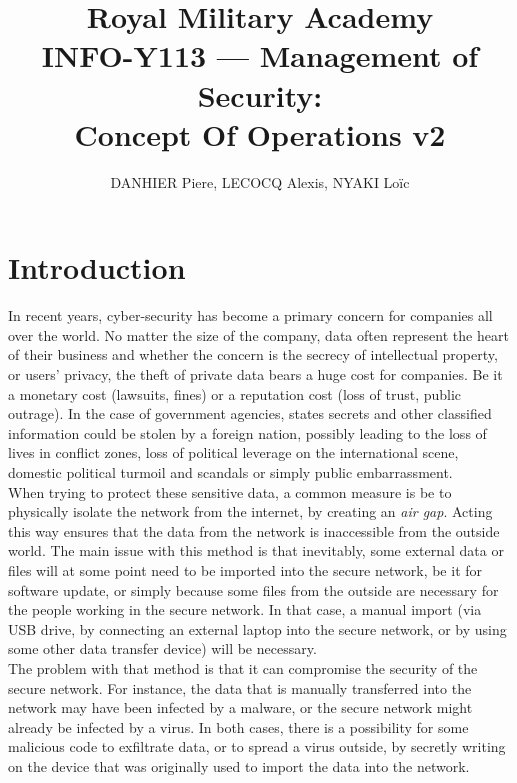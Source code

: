 \documentclass[a4paper,11pt]{article}
\title{Royal Military Academy\\
	INFO-Y113 --- Management of Security: \\
	Concept Of Operations v2}
\author{DANHIER Piere, LECOCQ Alexis, NYAKI Loïc}
\begin{document}
\maketitle
\newpage
\tableofcontents

\newpage

\section{Introduction}
In recent years, cyber-security has become a primary concern for companies all over the world. No matter the size of the company, data often represent the heart of their business and whether the concern is the secrecy of intellectual property, or users' privacy, the theft of private data bears a huge cost for companies. Be it a monetary cost (lawsuits, fines) or a reputation cost (loss of trust, public outrage). In the case of government agencies, states secrets and other classified information could be stolen by a foreign nation, possibly leading to the loss of lives in conflict zones, loss of political leverage on the international scene, domestic political turmoil and scandals or simply public embarrassment.\\

When trying to protect these sensitive data, a common measure is be to physically isolate the network from the internet, by creating an \textit{air gap}. Acting this way ensures that the data from the network is inaccessible from the outside world. The main issue with this method is that inevitably, some external data or files will at some point need to be imported into the secure network, be it for software update, or simply because some files from the outside are necessary for the people working in the secure network. In that case, a manual import (via USB drive, by connecting an external laptop into the secure network, or by using some other data transfer device) will be necessary.\\

The problem with that method is that it can compromise the security of the secure network. For instance, the data that is manually transferred into the network may have been infected by a malware, or the secure network might already be infected by a virus. In both cases, there is a possibility for some malicious code to exfiltrate data, or to spread a virus outside, by secretly writing on the device that was originally used to import the data into the network.\\
\end{document}
